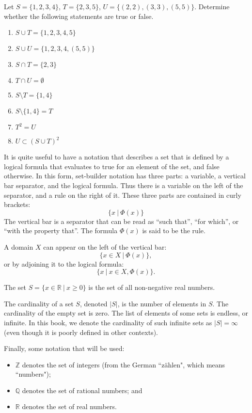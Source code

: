 \begin{exercise}
    Let $S = \{1, 2, 3, 4\}$, $T = \{2, 3, 5\}$, $U = \{(2, 2), (3, 3), (5, 5)\}$. Determine whether the following statements are true or false.
    \begin{enumerate}[label=(\alph*)]
        \item $S \cup T = \{1, 2, 3, 4, 5\}$
        \item $S \cup U = \{1, 2, 3, 4, (5, 5)\}$
        \item $S \cap T = \{2, 3\}$
        \item $T \cap U = \emptyset$
        \item $S \setminus T = \{1, 4\}$
        \item $S \setminus \{1, 4\} = T$
        \item $T^2 = U$
        \item $U \subset (S \cup T)^2$
    \end{enumerate}
\end{exercise}
It is quite useful to have a notation that describes a set that is defined by a logical formula that evaluates to true for an element of the set, and false otherwise. In this form, set-builder notation has three parts: a variable, a vertical bar separator, and the logical formula. Thus there is a variable on the left of the separator, and a rule on the right of it. These three parts are contained in curly brackets:
\[
    \{x \ | \ \Phi(x)\}
\]
The vertical bar is a separator that can be read as ``such that'', ``for which'', or ``with the property that''. The formula $\Phi(x)$ is said to be the rule.

A domain $X$ can appear on the left of the vertical bar:
\[
    \{x \in X \ | \ \Phi(x)\},
\]
or by adjoining it to the logical formula:
\[
    \{x \ | \ x \in X, \Phi(x)\}.
\]
\begin{example}
    The set $S = \{x \in \mathbb{R} \ | \ x \geq 0 \}$ is the set of all non-negative real numbers.
\end{example}

The cardinality of a set $S$, denoted $|S|$, is the number of elements in $S$. The cardinality of the empty set is zero. The list of elements of some sets is endless, or infinite. In this book, we denote the cardinality of such infinite sets as $|S| = \infty$ (even though it is poorly defined in other contexts).

Finally, some notation that will be used:
\begin{itemize}
    \item $\mathbb{Z}$ denotes the set of integers (from the German ``z\"ahlen", which means ``numbers");
    \item $\mathbb{Q}$ denotes the set of rational numbers; and
    \item $\mathbb{R}$ denotes the set of real numbers.
\end{itemize}

